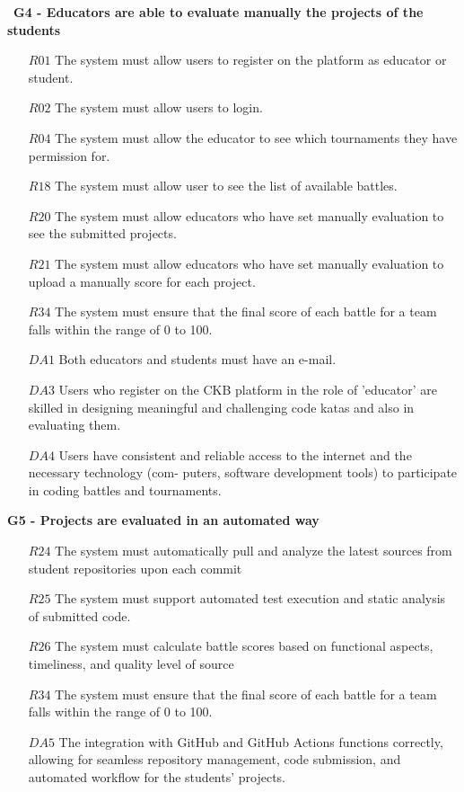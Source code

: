 \
 \textbf{G4 -  Educators are able to evaluate manually the projects of the students}
\begin{itemize}
 \item [$R01$] The system must allow users to register on the platform as educator or student.
\item [$R02$]The system must allow users to login.
\item [$R04$]The system must allow the educator to see which tournaments they have permission for.
\item [$R18$]The system must allow user to see the list of available battles.
\item [$R20$]The system must allow educators who have set manually evaluation to see the submitted projects.
\item [$R21$] The system must allow educators who have set manually evaluation to upload a manually score for
each project.
 \item [$R34$] The system must ensure that the final score of each battle for a team falls within the range of 0 to 100.
\item [$DA1$]Both educators and students must have an e-mail.
\item [$DA3$]Users who register on the CKB platform in the role of 'educator' are skilled  in designing meaningful and challenging code katas and also in evaluating them.
\item [$DA4$]Users have consistent and reliable access to the internet and the necessary technology (com-
puters, software development tools) to participate in coding battles and tournaments.
   
\end{itemize}

 \textbf{G5 - Projects are evaluated in an automated way}
\begin{itemize}
\item [$R24$]The system must automatically pull and analyze the latest sources from student repositories upon
each commit
\item [$R25$]The system must support automated test execution and static analysis of submitted code.
\item [$R26$]The system must calculate battle scores based on functional aspects, timeliness, and quality level
of source
 \item [$R34$] The system must ensure that the final score of each battle for a team falls within the range of 0 to 100.
\item[$DA5$]The integration with GitHub and GitHub Actions functions correctly, allowing for seamless
repository management, code submission, and automated workflow for the students’ projects.
\end{itemize}

